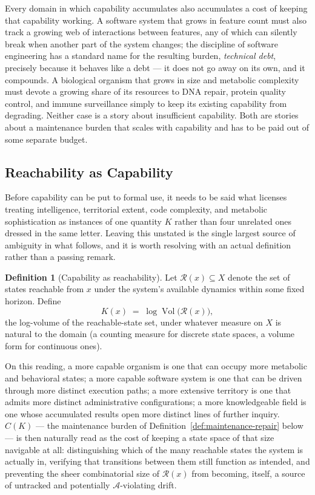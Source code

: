 \documentclass[11pt,a4paper]{article}
\theoremstyle{plain}
\theoremstyle{definition}
\newtheorem{definition}[theorem]{Definition}
\theoremstyle{remark}
\newcommand{\Adm}{\mathcal{A}}
\begin{document}
Every domain in which capability accumulates also accumulates a cost of keeping that capability working. A software system that grows in feature count must also track a growing web of interactions between features, any of which can silently break when another part of the system changes; the discipline of software engineering has a standard name for the resulting burden, \emph{technical debt}, precisely because it behaves like a debt — it does not go away on its own, and it compounds. A biological organism that grows in size and metabolic complexity must devote a growing share of its resources to DNA repair, protein quality control, and immune surveillance simply to keep its existing capability from degrading. Neither case is a story about insufficient capability. Both are stories about a maintenance burden that scales with capability and has to be paid out of some separate budget.

\subsection{Reachability as Capability}
\label{subsec:reachability-capability}

Before capability can be put to formal use, it needs to be said what licenses treating intelligence, territorial extent, code complexity, and metabolic sophistication as instances of one quantity $K$ rather than four unrelated ones dressed in the same letter. Leaving this unstated is the single largest source of ambiguity in what follows, and it is worth resolving with an actual definition rather than a passing remark.

\begin{definition}[Capability as reachability]
\label{def:capability-reachability}
Let $\mathcal{R}(x) \subseteq X$ denote the set of states reachable from $x$ under the system's available dynamics within some fixed horizon. Define
\[
K(x) \;=\; \log \operatorname{Vol}\big(\mathcal{R}(x)\big),
\]
the log-volume of the reachable-state set, under whatever measure on $X$ is natural to the domain (a counting measure for discrete state spaces, a volume form for continuous ones).
\end{definition}

On this reading, a more capable organism is one that can occupy more metabolic and behavioral states; a more capable software system is one that can be driven through more distinct execution paths; a more extensive territory is one that admits more distinct administrative configurations; a more knowledgeable field is one whose accumulated results open more distinct lines of further inquiry. $C(K)$ — the maintenance burden of Definition~\ref{def:maintenance-repair} below — is then naturally read as the cost of keeping a state space of that size navigable at all: distinguishing which of the many reachable states the system is actually in, verifying that transitions between them still function as intended, and preventing the sheer combinatorial size of $\mathcal{R}(x)$ from becoming, itself, a source of untracked and potentially $\Adm$-violating drift.
\end{document}
